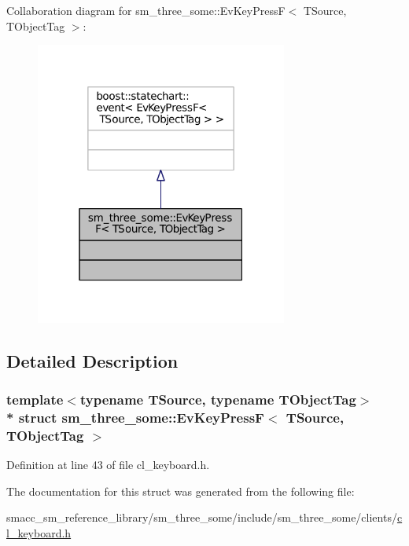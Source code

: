Collaboration diagram for sm\+\_\+three\+\_\+some\+:\+:Ev\+Key\+PressF$<$ T\+Source, T\+Object\+Tag $>$\+:
\nopagebreak
\begin{figure}[H]
\begin{center}
\leavevmode
\includegraphics[width=235pt]{structsm__three__some_1_1EvKeyPressF__coll__graph}
\end{center}
\end{figure}


\subsection{Detailed Description}
\subsubsection*{template$<$typename T\+Source, typename T\+Object\+Tag$>$\\*
struct sm\+\_\+three\+\_\+some\+::\+Ev\+Key\+Press\+F$<$ T\+Source, T\+Object\+Tag $>$}



Definition at line 43 of file cl\+\_\+keyboard.\+h.



The documentation for this struct was generated from the following file\+:\begin{DoxyCompactItemize}
\item 
smacc\+\_\+sm\+\_\+reference\+\_\+library/sm\+\_\+three\+\_\+some/include/sm\+\_\+three\+\_\+some/clients/\hyperlink{cl__keyboard_8h}{cl\+\_\+keyboard.\+h}\end{DoxyCompactItemize}
